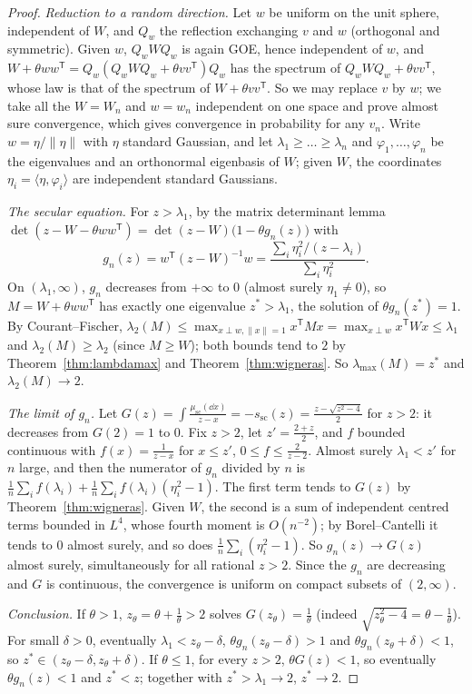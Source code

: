 \begin{proof}
\emph{Reduction to a random direction.} Let $w$ be uniform on the unit sphere, independent of $W$, and $Q_w$ the reflection exchanging $v$ and $w$ (orthogonal and symmetric). Given $w$, $Q_wWQ_w$ is again GOE, hence
independent of $w$, and $W+\theta ww^{\mathsf T}=Q_w(Q_wWQ_w+\theta vv^{\mathsf T})Q_w$ has the spectrum of $Q_wWQ_w+\theta vv^{\mathsf T}$, whose law is that of the spectrum of $W+\theta vv^{\mathsf T}$. So we may replace $v$ by $w$; we
take all the $W=W_n$ and $w=w_n$ independent on one space and prove almost sure convergence, which gives convergence in probability for any $v_n$. Write $w=\eta/\|\eta\|$ with $\eta$ standard Gaussian, and let
$\lambda_1\ge\dots\ge\lambda_n$ and $\varphi_1,\dots,\varphi_n$ be the eigenvalues and an orthonormal eigenbasis of $W$; given $W$, the coordinates $\eta_i=\langle\eta,\varphi_i\rangle$ are independent standard Gaussians.

\emph{The secular equation.} For $z>\lambda_1$, by the matrix determinant lemma $\det(z-W-\theta ww^{\mathsf T})=\det(z-W)\bigl(1-\theta g_n(z)\bigr)$ with
\[
g_n(z)=w^{\mathsf T}(z-W)^{-1}w=\frac{\sum_i\eta_i^2/(z-\lambda_i)}{\sum_i\eta_i^2}.
\]
On $(\lambda_1,\infty)$, $g_n$ decreases from $+\infty$ to $0$ (almost surely $\eta_1\ne0$), so $M=W+\theta ww^{\mathsf T}$ has exactly one eigenvalue $z^*>\lambda_1$, the solution of $\theta g_n(z^*)=1$. By Courant--Fischer,
$\lambda_2(M)\le\max_{x\perp w,\|x\|=1}x^{\mathsf T}Mx=\max_{x\perp w}x^{\mathsf T}Wx\le\lambda_1$ and $\lambda_2(M)\ge\lambda_2$ (since $M\ge W$); both bounds tend to $2$ by Theorem~\ref{thm:lambdamax} and Theorem~\ref{thm:wigneras}. So
$\lambda_{\max}(M)=z^*$ and $\lambda_2(M)\to2$.

\emph{The limit of $g_n$.} Let $G(z)=\int\frac{\mu_{\mathrm{sc}}(\dd x)}{z-x}=-s_{\mathrm{sc}}(z)=\frac{z-\sqrt{z^2-4}}2$ for $z>2$: it decreases from $G(2)=1$ to $0$. Fix $z>2$, let $z'=\frac{2+z}2$, and $f$ bounded continuous with
$f(x)=\frac1{z-x}$ for $x\le z'$, $0\le f\le\frac2{z-2}$. Almost surely $\lambda_1<z'$ for $n$ large, and then the numerator of $g_n$ divided by $n$ is $\frac1n\sum_if(\lambda_i)+\frac1n\sum_if(\lambda_i)(\eta_i^2-1)$. The first term
tends to $G(z)$ by Theorem~\ref{thm:wigneras}. Given $W$, the second is a sum of independent centred terms bounded in $L^4$, whose fourth moment is $O(n^{-2})$; by Borel--Cantelli it tends to $0$ almost surely, and so does
$\frac1n\sum_i(\eta_i^2-1)$. So $g_n(z)\to G(z)$ almost surely, simultaneously for all rational $z>2$. Since the $g_n$ are decreasing and $G$ is continuous, the convergence is uniform on compact subsets of $(2,\infty)$.

\emph{Conclusion.} If $\theta>1$, $z_\theta=\theta+\frac1\theta>2$ solves $G(z_\theta)=\frac1\theta$ (indeed $\sqrt{z_\theta^2-4}=\theta-\frac1\theta$). For small $\delta>0$, eventually $\lambda_1<z_\theta-\delta$, $\theta g_n(z_\theta-\delta)>1$ and $\theta g_n(z_\theta+\delta)<1$,
so $z^*\in(z_\theta-\delta,z_\theta+\delta)$. If $\theta\le1$, for every $z>2$, $\theta G(z)<1$, so eventually $\theta g_n(z)<1$ and $z^*<z$; together with $z^*>\lambda_1\to2$, $z^*\to2$.
\end{proof}

